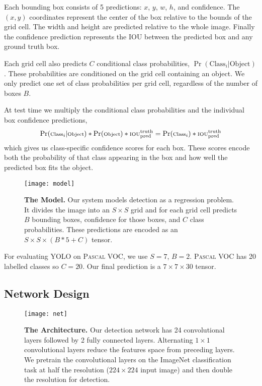 Each bounding box consists of 5 predictions: $x$, $y$, $w$, $h$, and confidence. The $(x,y)$ coordinates represent the center of the box relative to the bounds of the grid cell. The width and height are predicted relative to the whole image. Finally the confidence prediction represents the IOU between the predicted box and any ground truth box.

Each grid cell also predicts $C$ conditional class probabilities, $\Pr(\textrm{Class}_i | \textrm{Object})$. These probabilities are conditioned on the grid cell containing an object. We only predict one set of class probabilities per grid cell, regardless of the number of boxes $B$.

At test time we multiply the conditional class probabilities and the individual box confidence predictions,
\begin{equation}
\scriptsize
\Pr(\textrm{Class}_i | \textrm{Object}) * \Pr(\textrm{Object}) * \textrm{IOU}_{\textrm{pred}}^{\textrm{truth}} = \Pr(\textrm{Class}_i)*\textrm{IOU}_{\textrm{pred}}^{\textrm{truth}}
\end{equation}
which gives us class-specific confidence scores for each box. These scores encode both the probability of that class appearing in the box and how well the predicted box fits the object.

\begin{figure}[h]
\begin{center}
 \texttt{[image: model]}
\end{center}
 \caption{\small \textbf{The Model.} Our system models detection as a regression problem. It divides the image into an $S \times S$ grid and for each grid cell predicts $B$ bounding boxes, confidence for those boxes, and $C$ class probabilities. These predictions are encoded as an $S \times S \times (B*5 + C)$ tensor.}
\label{model}
\end{figure}

For evaluating YOLO on \textsc{Pascal} VOC, we use $S=7$, $B=2$. \textsc{Pascal} VOC has 20 labelled classes so $C=20$. Our final prediction is a $7 \times 7 \times 30$ tensor.

\subsection{Network Design}

 \begin{figure*}[t]
 \centering
 \texttt{[image: net]}
 \caption{\small \textbf{The Architecture.} Our detection network has 24 convolutional layers followed by 2 fully connected layers. Alternating $1 \times 1$ convolutional layers reduce the features space from preceding layers. We pretrain the convolutional layers on the ImageNet classification task at half the resolution ($224 \times 224$ input image) and then double the resolution for detection.}
 \label{net}
 \end{figure*}

